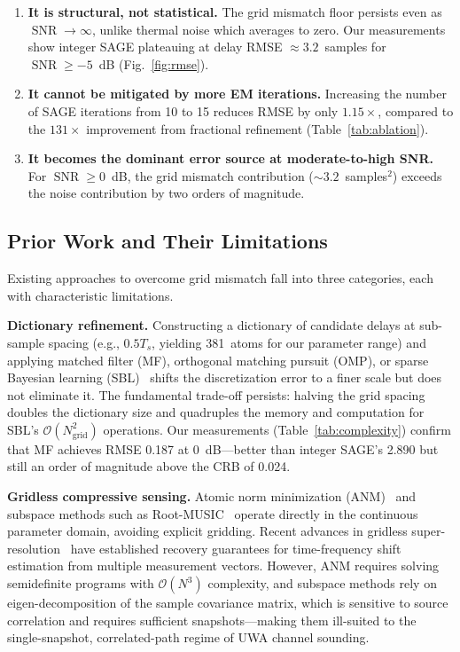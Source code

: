 \documentclass[journal]{IEEEtran}
\DeclareMathOperator{\SNR}{SNR}
\newcommand{\bigO}{\mathcal{O}}
\begin{document}
\begin{enumerate}
\item \textbf{It is structural, not statistical.} The grid mismatch floor persists even as $\SNR \to \infty$, unlike thermal noise which averages to zero. Our measurements show integer SAGE plateauing at delay RMSE $\approx 3.2$~samples for $\SNR \ge -5$~dB (Fig.~\ref{fig:rmse}).

\item \textbf{It cannot be mitigated by more EM iterations.} Increasing the number of SAGE iterations from 10 to 15 reduces RMSE by only $1.15\times$, compared to the $131\times$ improvement from fractional refinement (Table~\ref{tab:ablation}).

\item \textbf{It becomes the dominant error source at moderate-to-high SNR.} For $\SNR \ge 0$~dB, the grid mismatch contribution ($\sim 3.2$~samples$^2$) exceeds the noise contribution by two orders of magnitude.
\end{enumerate}

\subsection{Prior Work and Their Limitations}

Existing approaches to overcome grid mismatch fall into three categories, each with characteristic limitations.

\textbf{Dictionary refinement.} Constructing a dictionary of candidate delays at sub-sample spacing (e.g., $0.5T_s$, yielding 381~atoms for our parameter range) and applying matched filter (MF), orthogonal matching pursuit (OMP), or sparse Bayesian learning (SBL)~\cite{wipf2004} shifts the discretization error to a finer scale but does not eliminate it. The fundamental trade-off persists: halving the grid spacing doubles the dictionary size and quadruples the memory and computation for SBL's $\bigO(N_{\text{grid}}^2)$ operations. Our measurements (Table~\ref{tab:complexity}) confirm that MF achieves RMSE 0.187 at 0~dB---better than integer SAGE's 2.890 but still an order of magnitude above the CRB of 0.024.

\textbf{Gridless compressive sensing.} Atomic norm minimization (ANM)~\cite{tang2013,chi2020} and subspace methods such as Root-MUSIC~\cite{schmidt1986} operate directly in the continuous parameter domain, avoiding explicit gridding. Recent advances in gridless super-resolution~\cite{chi2020,safari2021} have established recovery guarantees for time-frequency shift estimation from multiple measurement vectors. However, ANM requires solving semidefinite programs with $\bigO(N^3)$ complexity, and subspace methods rely on eigen-decomposition of the sample covariance matrix, which is sensitive to source correlation and requires sufficient snapshots---making them ill-suited to the single-snapshot, correlated-path regime of UWA channel sounding.
\end{document}
